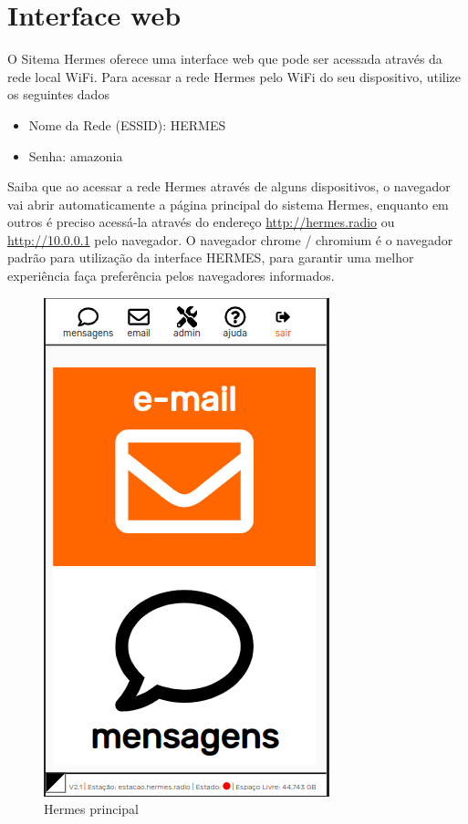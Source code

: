\documentclass[11pt,a4paper]{article}
\begin{document}
\section{Interface web}

O Sitema Hermes oferece uma interface web que pode ser acessada através da rede local WiFi. Para acessar a rede Hermes pelo WiFi do seu dispositivo, utilize os seguintes dados 
\begin{itemize}
    \item Nome da Rede (ESSID): HERMES
    \item Senha: amazonia
\end{itemize}

Saiba que ao acessar a rede Hermes através de alguns dispositivos, o navegador vai abrir automaticamente a página principal do sistema Hermes, enquanto em outros é preciso acessá-la através do endereço \url{http://hermes.radio} ou \url{http://10.0.0.1} pelo navegador.
O navegador chrome / chromium é o navegador padrão para utilização da interface HERMES, para garantir uma melhor experiência faça preferência pelos navegadores informados.

   \begin{figure}[H]
    \centering
    \includegraphics[width=0.5\columnwidth]{screenshots/frontend/pt_kn/landing.png}
    \caption{Hermes principal}
    \label{fig:interface}
    \end{figure}
\end{document}

